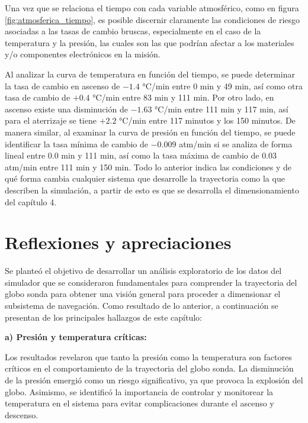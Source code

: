 Una vez que se relaciona el tiempo con cada variable atmosférico, como en figura \ref{fig:atmosferica_tiempo}, es posible discernir claramente las condiciones de riesgo asociadas a las tasas de cambio bruscas, especialmente en el caso de la temperatura y la presión, las cuales son las que podrían afectar a los materiales y/o componentes electrónicos en la misión.

Al analizar la curva de temperatura en función del tiempo, se puede determinar la tasa de cambio en ascenso de $-1.4$ °C/min entre 0 min y 49 min, así como otra tasa de cambio de $+0.4$ °C/min entre 83 min y 111 min. Por otro lado, en ascenso existe una disminución de $-1.63$ °C/min entre 111 min y 117 min, así para el aterrizaje se tiene $+2.2$ °C/min entre 117 minutos y los 150 minutos. De manera similar, al examinar la curva de presión en función del tiempo, se puede identificar la tasa mínima de cambio de $-0.009$ atm/min si se analiza de forma lineal entre 0.0 min y 111 min, así como la tasa máxima de cambio de $0.03$ atm/min entre 111 min y 150 min. Todo lo anterior indica las condiciones y de qué forma cambia cualquier sistema que desarrolle la trayectoria como la que describen la simulación, a partir de esto es que se desarrolla el dimensionamiento del capítulo 4.




\newpage

\section{Reflexiones y apreciaciones}


Se planteó el objetivo de desarrollar un análisis exploratorio de los datos del simulador  que se consideraron fundamentales para comprender la trayectoria del globo sonda para obtener una visión general para proceder a dimensionar el subsistema de navegación. Como resultado de lo anterior,  a continuación se presentan de los principales hallazgos de este capítulo:

\textbf{a) Presión y temperatura críticas:}

Los resultados revelaron que tanto la presión como la temperatura son factores críticos en el comportamiento de la trayectoria del globo sonda. La disminución de la presión emergió como un riesgo significativo, ya que provoca la explosión del globo. Asimismo, se identificó la importancia de controlar y monitorear la temperatura en el sistema para evitar complicaciones durante el ascenso y descenso.

